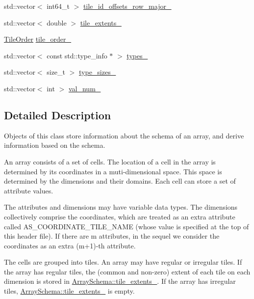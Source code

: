 \begin{DoxyCompactItemize}
\item 
std\+::vector$<$ int64\+\_\+t $>$ \hyperlink{classArraySchema_a3e6712cb7b36f925bf08a56b09b0e04e}{tile\+\_\+id\+\_\+offsets\+\_\+row\+\_\+major\+\_\+}
\item 
std\+::vector$<$ double $>$ \hyperlink{classArraySchema_a45f6329cc884ce9446a3cd3006b526bc}{tile\+\_\+extents\+\_\+}
\item 
\hyperlink{classArraySchema_ae9240847f83a545b7de651f032ffde63}{Tile\+Order} \hyperlink{classArraySchema_a194aefe70d1c7b09c6a8d7edae62e39a}{tile\+\_\+order\+\_\+}
\item 
std\+::vector$<$ const std\+::type\+\_\+info $\ast$ $>$ \hyperlink{classArraySchema_a80d3c3d1161f55719bb3848175ae49fa}{types\+\_\+}
\item 
std\+::vector$<$ size\+\_\+t $>$ \hyperlink{classArraySchema_a13d059194797b852c97cb0dfc7226249}{type\+\_\+sizes\+\_\+}
\item 
std\+::vector$<$ int $>$ \hyperlink{classArraySchema_ab9dce02b21f7c1124c54fdc339d8c96a}{val\+\_\+num\+\_\+}
\end{DoxyCompactItemize}


\subsection{Detailed Description}
Objects of this class store information about the schema of an array, and derive information based on the schema.

An array consists of a set of cells. The location of a cell in the array is determined by its coordinates in a muti-\/dimensional space. This space is determined by the dimensions and their domains. Each cell can store a set of attribute values.

The attributes and dimensions may have variable data types. The dimensions collectively comprise the coordinates, which are treated as an extra attribute called A\+S\+\_\+\+C\+O\+O\+R\+D\+I\+N\+A\+T\+E\+\_\+\+T\+I\+L\+E\+\_\+\+N\+A\+M\+E (whose value is specified at the top of this header file). If there are m attributes, in the sequel we consider the coordinates as an extra (m+1)-\/th attribute.

The cells are grouped into tiles. An array may have regular or irregular tiles. If the array has regular tiles, the (common and non-\/zero) extent of each tile on each dimension is stored in \hyperlink{classArraySchema_a45f6329cc884ce9446a3cd3006b526bc}{Array\+Schema\+::tile\+\_\+extents\+\_\+}. If the array has irregular tiles, \hyperlink{classArraySchema_a45f6329cc884ce9446a3cd3006b526bc}{Array\+Schema\+::tile\+\_\+extents\+\_\+} is empty. 

